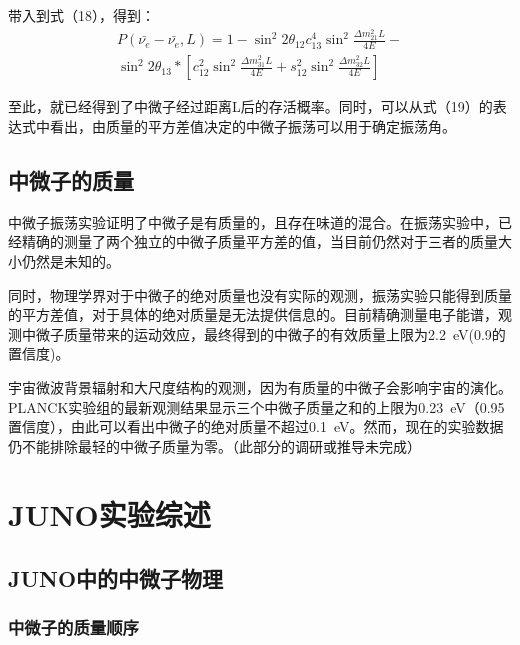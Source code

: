 \documentclass[10pt,a4paper]{article}
\begin{document}
带入到式（18），得到：
\begin{equation}
\begin{split}
P(\bar{\nu_e}-\bar{\nu_e},L)=1-{\sin^2{2\theta_{12}}} c_{13}^4\sin^2{\frac{\Delta{m_{21}^2}L}{4E}}-\\
\sin^2{2\theta_{13}} *[c_{12}^2\sin^2{\frac{\Delta{m_{31}^2}L}{4E}}+s_{12}^2\sin^2{\frac{\Delta{m_{32}^2}L}{4E}}]
\end{split}
\end{equation}

至此，就已经得到了中微子经过距离L后的存活概率。同时，可以从式（19）的表达式中看出，由质量的平方差值决定的中微子振荡可以用于确定振荡角。
\newpage
\subsection{中微子的质量}\label{sub:sysover}

中微子振荡实验证明了中微子是有质量的，且存在味道的混合。在振荡实验中，已经精确的测量了两个独立的中微子质量平方差的值，当目前仍然对于三者的质量大小仍然是未知的。

同时，物理学界对于中微子的绝对质量也没有实际的观测，振荡实验只能得到质量的平方差值，对于具体的绝对质量是无法提供信息的。目前精确测量电子能谱，观测中微子质量带来的运动效应，最终得到的中微子的有效质量上限为\SI{2.2}{eV}(0.9的置信度)。

宇宙微波背景辐射和大尺度结构的观测，因为有质量的中微子会影响宇宙的演化。PLANCK实验组的最新观测结果显示三个中微子质量之和的上限为\SI{0.23}{eV}（0.95置信度），由此可以看出中微子的绝对质量不超过\SI{0.1}{eV}。然而，现在的实验数据仍不能排除最轻的中微子质量为零。（此部分的调研或推导未完成）

\newpage
\section{JUNO实验综述} \label{sysdes}%

\subsection{JUNO中的中微子物理}\label{sub:sysover}
\subsubsection{中微子的质量顺序}\label{sub:sysover}
\end{document}
